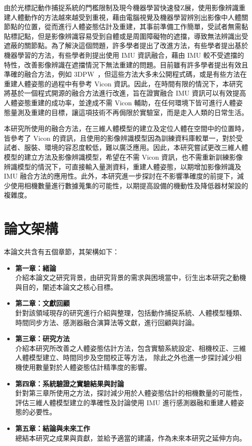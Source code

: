 由於光標記動作捕捉系統的門檻限制及現今機器學習快速發Z展，使用影像辨識重建人體動作的方法越來越受到重視，藉由電腦視覺及機器學習辨別出影像中人體關節點的位置，從而進行人體姿態估計及重建，其事前準備工作簡單，受試者無需黏貼標記點，但是影像辨識容易受到自體或是周圍障礙物的遮擋，導致無法辨識出受遮蔽的關節點。為了解決這個問題，許多學者提出了改進方法，有些學者提出基於機器學習的方法，有些學者則提出使用 IMU 資訊融合，藉由 IMU 較不受遮擋的特性，改善影像辨識在遮擋情況下無法重建的問題。目前雖有許多學者提出有效且準確的融合方法，例如 3DPW~\cite{vonMarcard2018}，但這些方法大多未公開程式碼，或是有些方法在重建人體姿態的過程中有參考 Vicon 資訊。因此，在時間有限的情況下，本研究將基於一個程式開源的融合方法進行改進，旨在證實融合 IMU 資訊可以有效提高人體姿態重建的成功率，並達成不需 Vicon 輔助，在任何環境下皆可進行人體姿態量測及重建的目標，讓這項技術不再侷限於實驗室，而是走入人類的日常生活。

本研究所使用的融合方法，在三維人體模型的建立及定位人體在空間中的位置時，皆參考了 Vicon 的資訊，且使用的影像辨識模型因為訓練資料庫較單一，對於受試者、服裝、環境的容忍度較低，難以廣泛應用。因此，本研究嘗試更改三維人體模型的建立方法及影像辨識模型，希望在不需 Vicon 資訊，也不需重新訓練影像辨識模型的情況下，可直接輸入量測資料，重建人體姿態，以期增加影像辨識及 IMU 融合方法的應用性。此外，本研究進一步探討在不影響準確度的前提下，減少使用相機數量進行數據蒐集的可能性，以期提高設備的機動性及降低器材架設的複雜度。


\section{論文架構}
本論文共含有五個章節，其架構如下：

\begin{itemize}
    \item \textbf{第一章：緒論}
    \\ 介紹本論文之研究背景，由研究背景的需求與困境當中，衍生出本研究之動機與目的，闡述本論文之核心目標。
    \item \textbf{第二章：文獻回顧}
    \\ 針對該領域現存的研究進行介紹與整理，包括動作捕捉系統、人體模型種類、時間同步方法、感測器融合演算法等文獻，進行回顧與討論。
    \item \textbf{第三章：研究方法}
    \\ 介紹本研究所改善之人體姿態估計方法，包含實驗系統設定、相機校正、三維人體模型建立、時間同步及空間校正等方法，
    除此之外也進一步探討減少相機使用數量對於人體姿態估計精準度的影響。
    \item \textbf{第四章：系統驗證之實驗結果與討論}
    \\ 針對第三章所使用之方法，探討減少用於人體姿態估計的相機數量的可能性，評估三維人體模型建立的準確性及討論使用 IMU 進行感測器融和重建人體姿態的必要性。
    \item \textbf{第五章：結論與未來工作}
    \\ 總結本研究之成果與貢獻，並給予適當的建議，作為未來本研究之延伸方向。
\end{itemize}

\clearpage